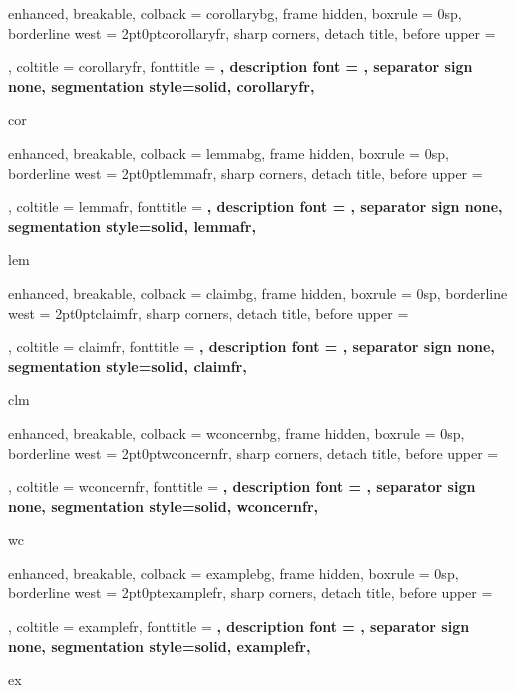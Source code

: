 {%
    enhanced,
    breakable,
    colback = corollarybg,
    frame hidden,
    boxrule = 0sp,
    borderline west = {2pt}{0pt}{corollaryfr},
    sharp corners,
    detach title,
    before upper = \tcbtitle\par\smallskip,
    coltitle = corollaryfr,
    fonttitle = \bfseries\sffamily,
    description font = \mdseries,
    separator sign none,
    segmentation style={solid, corollaryfr},
}
{cor}

{%
    enhanced,
    breakable,
    colback = lemmabg,
    frame hidden,
    boxrule = 0sp,
    borderline west = {2pt}{0pt}{lemmafr},
    sharp corners,
    detach title,
    before upper = \tcbtitle\par\smallskip,
    coltitle = lemmafr,
    fonttitle = \bfseries\sffamily,
    description font = \mdseries,
    separator sign none,
    segmentation style={solid, lemmafr},
}
{lem}

{%
    enhanced,
    breakable,
    colback = claimbg,
    frame hidden,
    boxrule = 0sp,
    borderline west = {2pt}{0pt}{claimfr},
    sharp corners,
    detach title,
    before upper = \tcbtitle\par\smallskip,
    coltitle = claimfr,
    fonttitle = \bfseries\sffamily,
    description font = \mdseries,
    separator sign none,
    segmentation style={solid, claimfr},
}
{clm}

{%
    enhanced,
    breakable,
    colback = wconcernbg,
    frame hidden,
    boxrule = 0sp,
    borderline west = {2pt}{0pt}{wconcernfr},
    sharp corners,
    detach title,
    before upper = \tcbtitle\par\smallskip,
    coltitle = wconcernfr,
    fonttitle = \bfseries\sffamily,
    description font = \mdseries,
    separator sign none,
    segmentation style={solid, wconcernfr},
}
{wc}

{%
    enhanced,
    breakable,
    colback = examplebg,
    frame hidden,
    boxrule = 0sp,
    borderline west = {2pt}{0pt}{examplefr},
    sharp corners,
    detach title,
    before upper = \tcbtitle\par\smallskip,
    coltitle = examplefr,
    fonttitle = \bfseries\sffamily,
    description font = \mdseries,
    separator sign none,
    segmentation style={solid, examplefr},
}
{ex}

